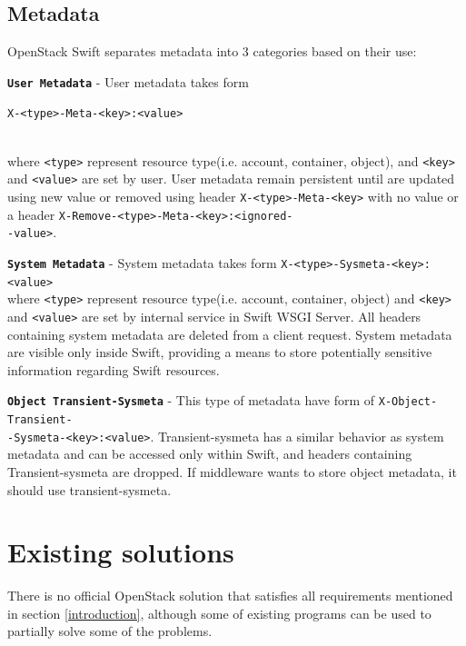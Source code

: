 \documentclass{ExcelAtFIT}
\begin{document}
\subsection{Metadata}
OpenStack Swift separates metadata into 3 categories based on their use:

\textbf{\texttt{User Metadata}} - User metadata takes form \\
\centerline{\texttt{X-<type>-Meta-<key>:<value>}}\\ where \texttt{<type>} represent resource type(i.e. account, container, object), and \texttt{<key>} and \texttt{<value>} are set by user. User metadata remain persistent until are updated using new value or removed using header \texttt{X-<type>-Meta-<key>} with no value or a header \texttt{X-Remove-<type>-Meta-<key>:<ignored-\\-value>}.

\textbf{\texttt{System Metadata}} - System metadata takes form \texttt{X-<type>-Sysmeta-<key>:<value>}\\ where \texttt{<type>} represent resource type(i.e. account, container, object) and \texttt{<key>} and \texttt{<value>} are set by internal service in Swift WSGI Server. All headers containing system metadata are deleted from a client request. System metadata are visible only inside Swift, providing a means to store potentially sensitive information regarding Swift resources.

\textbf{\texttt{Object Transient-Sysmeta}} - This type of metadata have form of \texttt{X-Object-Transient-\\-Sysmeta-<key>:<value>}. Transient-sysmeta has a similar behavior as system metadata and can be accessed only within Swift, and headers containing Transient-sysmeta are dropped. If middleware wants to store object metadata, it should use transient-sysmeta\cite{swiftMiddleware}.


\section{Existing solutions}
There is no official OpenStack solution that satisfies all requirements mentioned in section \ref{introduction}, although some of existing programs can be used to partially solve some of the problems.
\end{document}

